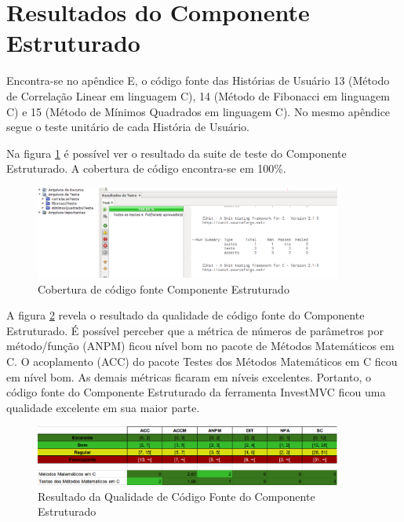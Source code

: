 \section{Resultados do Componente Estruturado}

Encontra-se no apêndice E,  o código fonte das Histórias de Usuário 13 (Método de Correlação Linear em linguagem C), 14 (Método de Fibonacci em linguagem C) e 15 (Método de Mínimos Quadrados em linguagem C). No mesmo apêndice segue o teste unitário de cada História de Usuário.

Na figura \ref{coberturaEstrturado} é possível ver o resultado da suite de teste do Componente Estruturado. A cobertura de código encontra-se em 100\%.

\begin{figure}[H]
\centering
\includegraphics[width=0.9\textwidth]{figuras/coberturaEstruturado}
\caption{Cobertura de código fonte Componente Estruturado}
\label{coberturaEstrturado}
\end{figure}

A figura \ref{qualidadeEstruturado} revela o resultado da qualidade de código fonte do Componente Estruturado. É possível perceber que a métrica de números de parâmetros por método/função (ANPM) ficou nível bom no pacote de Métodos Matemáticos em C. O acoplamento (ACC) do pacote Testes dos Métodos Matemáticos em C ficou em nível bom. As demais métricas ficaram em níveis excelentes. Portanto, o código fonte do Componente Estruturado da  ferramenta InvestMVC ficou uma qualidade excelente em sua maior parte.

\begin{figure}[H]
\centering
\includegraphics[width=0.9\textwidth]{figuras/qualidadeEstruturado}
\caption{Resultado da Qualidade de Código Fonte do Componente Estruturado} 
\label{qualidadeEstruturado}
\end{figure}

